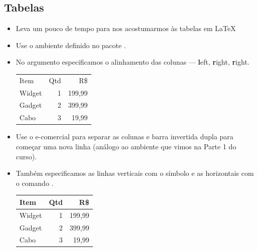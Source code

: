\documentclass[xcolor=table]{beamer}
\begin{document}
\subsection{Tabelas}
\begin{frame}[fragile]{\insertsubsection}
	\begin{itemize}
		\item Leva um pouco de tempo para nos acostumarmos às tabelas em \LaTeX{} 
		\item Use o ambiente  definido no pacote .
		\item No argumento especificamos o alinhamento das colunas --- \textbf{l}eft, \textbf{r}ight, \textbf{r}ight.
		\begin{exampletwouptiny}
			\begin{tabular}{lrr}
				Item   & Qtd & R\$ \\
				Widget & 1   & 199,99  \\
				Gadget & 2   & 399,99  \\
				Cabo   & 3   & 19,99   \\
			\end{tabular}
		\end{exampletwouptiny}
		\item Use o e-comercial \keystrokebftt{\&} para separar as colunas e barra invertida dupla \keystrokebftt{\bs\bs} para começar uma nova linha (análogo ao ambiente  que vimos na Parte 1 do curso).

	\end{itemize}
\end{frame}

\begin{frame}[fragile]{\insertsubsection}
	\begin{itemize}
		\item Também especificamos as linhas verticais com o símbolo \keystrokebftt{|} e as horizontais com o comando .
		
		\begin{exampletwouptiny}
			\begin{tabular}{|l|r|r|} 	\hline
				Item   & Qtd & R\$ 		\\ \hline
				Widget & 1   & 199,99  	\\
				Gadget & 2   & 399,99  	\\
				Cabo   & 3   & 19,99   	\\ \hline
			\end{tabular}
		\end{exampletwouptiny}
	\end{itemize}
\end{frame}
\end{document}

